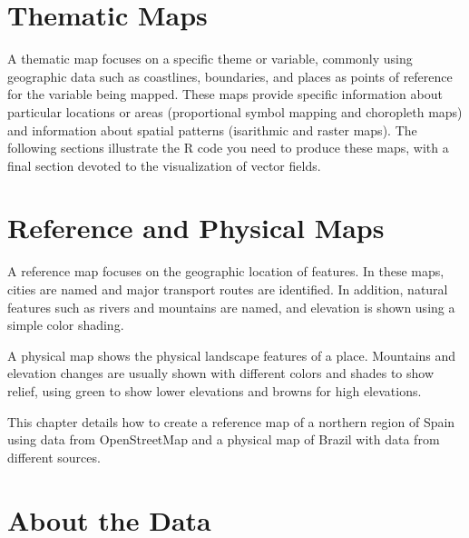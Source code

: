 \chapter{Thematic Maps}
\label{cha:thematicMaps}

A thematic map focuses on a specific theme or variable, commonly using
geographic data such as coastlines, boundaries, and places as points
of reference for the variable being mapped. These maps provide
specific information about particular locations or areas (proportional
symbol mapping and choropleth maps) and information about spatial
patterns (isarithmic and raster maps). The following sections illustrate
the \textsf{R} code you need to produce these maps, with a final
section devoted to the visualization of vector fields.






\chapter{Reference and Physical Maps}
\label{cha:refer-phys-maps}

A reference map focuses on the geographic location of features. In
these maps, cities are named and major transport routes are
identified. In addition, natural features such as rivers and mountains are
named, and elevation is shown using a simple color shading.  

A physical map shows the physical landscape features of a
place. Mountains and elevation changes are usually shown with
different colors and shades to show relief, using green to show
lower elevations and browns for high elevations.

This chapter details how to create a reference map of a northern
region of Spain using data from OpenStreetMap and a physical map of
Brazil with data from different sources.




\chapter{About the Data}
\label{cha:dataSpatial}





